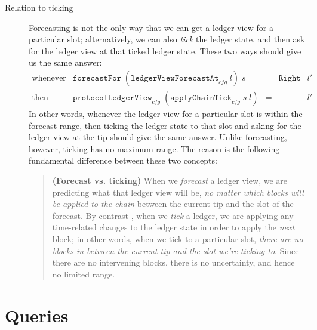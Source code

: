\begin{description}
\item[Relation to ticking]
Forecasting is not the only way that we can get a ledger view for a particular
slot; alternatively, we can also \emph{tick} the ledger state, and then ask
for the ledger view at that ticked ledger state. These two ways should give us
the same answer:
%
\begin{equation}
\begin{array}{lllll}
\mathrm{whenever} &
\mathtt{forecastFor} \; (\mathtt{ledgerViewForecastAt}_\mathit{cfg} \; l) \; s & = & \mathtt{Right} & l' \\
\mathrm{then} & \mathtt{protocolLedgerView}_\mathit{cfg} \; (\mathtt{applyChainTick}_\mathit{cfg} \; s \; l) & = && l'
\end{array}
\end{equation}
%
In other words, whenever the ledger view for a particular slot is within the
forecast range, then ticking the ledger state to that slot and asking for the
ledger view at the tip should give the same answer. Unlike forecasting, however,
ticking has no maximum range. The reason is the following fundamental difference between these two concepts:
%
\begin{quote}
\textbf{(Forecast vs. ticking)} When we \emph{forecast} a ledger view, we are
predicting what that ledger view will be, \emph{no matter which blocks will  be
applied to the chain} between the current tip and the slot of the forecast. By
contrast , when we \emph{tick} a ledger, we are applying any time-related
changes to the ledger state in order to apply the \emph{next} block; in other
words, when we tick to a particular slot, \emph{there \emph{are} no blocks in
between the current tip and the slot we're ticking to}. Since there are no
intervening blocks, there is no uncertainty, and hence no limited range.
\end{quote}
\end{description}

\section{Queries}
\label{ledger:queries}
